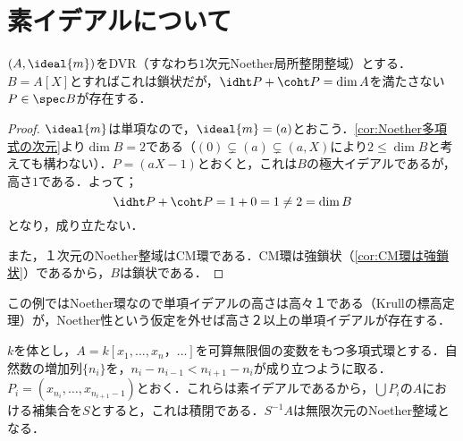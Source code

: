 \section{素イデアルについて}
\begin{surex}[鎖状だが$\idht P+\coht P=\dim A$が成りたたない例]\label{ex:鎖状だがht P+coht P<dim P}
	$(A,\ideal{m})$をDVR（すなわち$1$次元Noether局所整閉整域）とする．$B=A[X]$とすればこれは鎖状だが，$\idht P+\coht P=\dim A$を満たさない$P\in\spec B$が存在する．
\end{surex}

\begin{proof}
	$\ideal{m}$は単項なので，$\ideal{m}=(a)$とおこう．\ref{cor:Noether多項式の次元}より$\dim B=2$である（$(0)\subsetneq (a)\subsetneq (a,X)$により$2\leq\dim B$と考えても構わない）．$P=(aX-1)$とおくと，これは$B$の極大イデアルであるが，高さ$1$である．よって；
	\[\idht P+\coht P=1+0=1\neq 2=\dim B\]
	となり，成り立たない．
	
	また，１次元のNoether整域はCM環である．CM環は強鎖状（\ref{cor:CM環は強鎖状}）であるから，$B$は鎖状である．
\end{proof}

この例ではNoether環なので単項イデアルの高さは高々１である（Krullの標高定理）が，Noether性という仮定を外せば高さ２以上の単項イデアルが存在する．
\begin{surex}\label{ex:無限次元Noether環}
	$k$を体とし，$A=k[x_1,\dots,x_n，\dots]$を可算無限個の変数をもつ多項式環とする．自然数の増加列$\{n_i\}$を，$n_i-n_{i-1}<n_{i+1}-n_i$が成り立つように取る．$P_i=(x_{n_i},\dots,x_{n_{i+1}-1})$とおく．これらは素イデアルであるから，$\bigcup P_i$の$A$における補集合を$S$とすると，これは積閉である．$S^{-1}A$は無限次元のNoether整域となる．
\end{surex}

